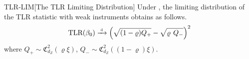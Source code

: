 \begin{propositionp}{TLR-LIM}[The TLR Limiting Distribution]\label{prop:tlr-lim}
    Under , the limiting distribution of the TLR statistic with weak instruments obtains as follows.
    \begin{align}
    \textrm{TLR}(\beta_0) \xrightarrow{{\scriptscriptstyle \mathrm{\;d\;}}}
    \left(\sqrt{(1-\varrho) Q_+}-\sqrt{\varrho\phantom{(} Q_-}\right)^2
\end{align}
where \(Q_+\sim \mathfrak{C}^2_{d_Z}(\varrho\xi)\), \(Q_-\sim \mathfrak{C}^2_{d_Z}((1-\varrho)\xi)\).
\end{propositionp}
